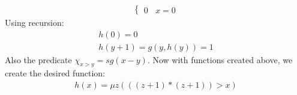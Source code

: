 \begin{enumerate}[label=\textbf{(\textit{\roman*})}]
\begin{gather*}
\begin{cases}
                0 \ \ \ \ x = 0
            \end{cases}
        \end{gather*}
        Using recursion:
        \begin{gather*}
            h(0) = 0 \\
            h(y + 1) = g(y, h(y)) = 1
        \end{gather*}
        Also the predicate $\chi_{x > y} = sg(x - y)$.\newline
        Now with functions created above, we create the desired function:
        \begin{gather*}
            h(x) = \mu z(((z + 1) * (z + 1)) > x)
        \end{gather*}
\end{enumerate}